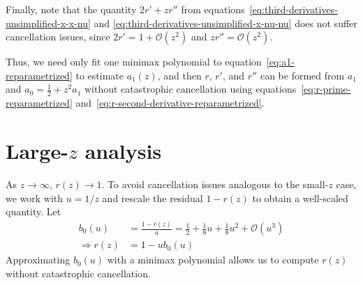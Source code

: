\documentclass{article}
\begin{document}

Finally, note that the quantity $2r' + z r''$ from equations~\eqref{eq:third-derivatives-unsimplified-x-x-nu} and
\eqref{eq:third-derivatives-unsimplified-x-nu-nu} does not suffer cancellation issues, since $2r' = 1 + \mathcal{O}(z^2)$ and $z r'' = \mathcal{O}(z^2)$.

Thus, we need only fit one minimax polynomial to equation~\eqref{eq:a1-reparametrized} to estimate $a_1(z)$, and then $r$, $r'$, and $r''$ can be formed from $a_1$ and $a_0 = \frac{1}{2} + z^2 a_1$ without catastrophic cancellation using equations~\eqref{eq:r-prime-reparametrized} and~\eqref{eq:r-second-derivative-reparametrized}.

\section{Large-$z$ analysis}

As $z \to \infty$, $r(z) \to 1$.
To avoid cancellation issues analogous to the small-$z$ case, we work with $u=1/z$ and rescale the residual $1-r(z)$ to obtain a well-scaled quantity.
Let
%
\begin{align}
  b_0(u)           & = \frac{1-r(z)}{u} = \frac{1}{2} + \frac{1}{8} u + \frac{1}{8} u^2 + \mathcal{O}(u^3) \\
  \Rightarrow r(z) & = 1 - u b_0(u) \label{eq:r-large-reparametrized}
\end{align}
%
Approximating $b_0(u)$ with a minimax polynomial allows us to compute $r(z)$ without catastrophic cancellation.
\end{document}

